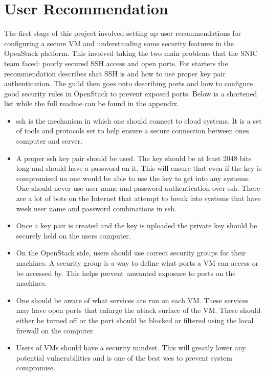 \documentclass[12pt]{article}
\begin{document}
\section{User Recommendation}
The first stage of this project involved setting up user recommendations for configuring a secure VM and understanding some security features in the OpenStack platform. This involved taking the two main problems that the SNIC team faced: poorly secured SSH access and open ports. For starters the recommendation describes shat SSH is and how to use proper key pair authentication. The guild then goes onto describing ports and how to configure good security rules in OpenStack to prevent exposed ports. Below is a shortened list while the full readme can be found in the appendix.

\begin{itemize}
    \item ssh is the mechanism in which one should connect to cloud systems. It is a set of tools and protocols set to help ensure a secure connection between ones computer and server.
    \item A proper ssh key pair should be used. The key should be at least 2048 bits long and should have a password on it. This will ensure that even if the key is compromised no one would be able to use the key to get into any systems. One should never use user name and password authentication over ssh. There are a lot of bots on the Internet that attempt to break into systems that have week user name and password combinations in ssh.
    \item Once a key pair is created and the key is uploaded the private key should be securely held on the users computer.
    \item On the OpenStack side, users should use correct security groups for their machines. A security group is a way to define what ports a VM can access or be accessed by. This helps prevent unwanted exposure to ports on the machines.
    \item One should be aware of what services are run on each VM. These services may have open ports that enlarge the attack surface of the VM. These should either be turned off or the port should be blocked or filtered using the local firewall on the computer.
    \item Users of VMs should have a security mindset. This will greatly lower any potential vulnerabilities and is one of the best wes to prevent system compromise.

\end{itemize}
\end{document}
